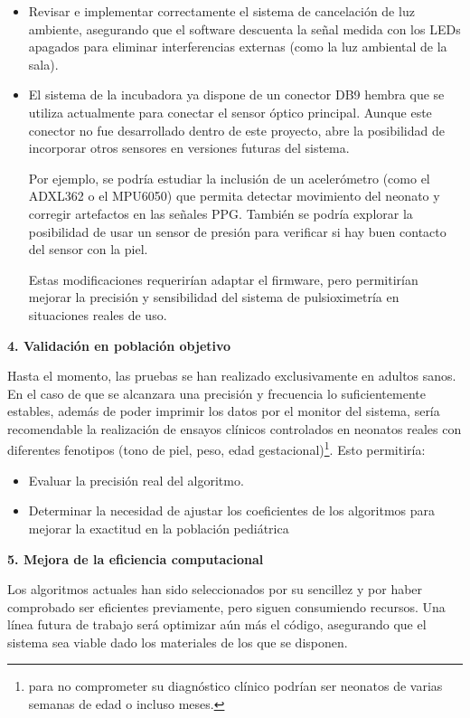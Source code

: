 \begin{itemize}
\item Revisar e implementar correctamente el sistema de cancelación de luz ambiente, asegurando que el software descuenta la señal medida con los LEDs apagados para eliminar interferencias externas (como la luz ambiental de la sala).
\item El sistema de la incubadora ya dispone de un conector DB9 hembra que se utiliza actualmente para conectar el sensor óptico principal. Aunque este conector no fue desarrollado dentro de este proyecto, abre la posibilidad de incorporar otros sensores en versiones futuras del sistema.

Por ejemplo, se podría estudiar la inclusión de un acelerómetro (como el ADXL362 o el MPU6050) que permita detectar movimiento del neonato y corregir artefactos en las señales PPG. También se podría explorar la posibilidad de usar un sensor de presión para verificar si hay buen contacto del sensor con la piel.

Estas modificaciones requerirían adaptar el firmware, pero permitirían mejorar la precisión y sensibilidad del sistema de pulsioximetría en situaciones reales de uso.

\end{itemize}

\textbf{4. Validación en población objetivo}

Hasta el momento, las pruebas se han realizado exclusivamente en adultos sanos. En el caso de que se alcanzara una precisión y frecuencia lo suficientemente estables, además de poder imprimir los datos por el monitor del sistema, sería recomendable la realización de ensayos clínicos controlados en neonatos reales con diferentes fenotipos (tono de piel, peso, edad gestacional)\footnote{para no comprometer su diagnóstico clínico podrían ser neonatos de varias semanas de edad o incluso meses.}. Esto permitiría:

\begin{itemize}
\item Evaluar la precisión real del algoritmo.
\item Determinar la necesidad de ajustar los coeficientes de los algoritmos para mejorar la exactitud en la población pediátrica
\end{itemize}


\textbf{5. Mejora de la eficiencia computacional}

Los algoritmos actuales han sido seleccionados por su sencillez y por haber comprobado ser eficientes previamente, pero siguen consumiendo recursos. Una línea futura de trabajo será optimizar aún más el código, asegurando que el sistema sea viable dado los materiales de los que se disponen.

